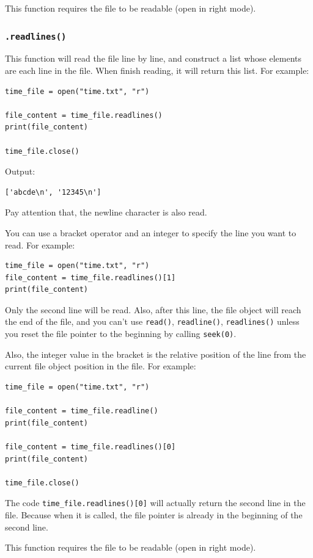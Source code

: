 \documentclass[12pt]{book}
\begin{document}
This function requires the file to be readable (open in right mode).
\subsubsection{\texttt{.readlines()}}
\label{sec:orgbf849f6}
This function will read the file line by line, and construct a list whose elements are each line in the file. When finish reading, it will return this list. For example:
\begin{verbatim}
time_file = open("time.txt", "r")

file_content = time_file.readlines()
print(file_content)

time_file.close()
\end{verbatim}
Output:
\begin{verbatim}
['abcde\n', '12345\n']
\end{verbatim}
Pay attention that, the newline character is also read.

You can use a bracket operator and an integer to specify the line you want to read. For example:
\begin{verbatim}
time_file = open("time.txt", "r")
file_content = time_file.readlines()[1]
print(file_content)
\end{verbatim}
Only the second line will be read. Also, after this line, the file object will reach the end of the file, and you can't use \texttt{read()}, \texttt{readline()}, \texttt{readlines()} unless you reset the file pointer to the beginning by calling \texttt{seek(0)}.

Also, the integer value in the bracket is the relative position of the line from the current file object position in the file. For example:
\begin{verbatim}
time_file = open("time.txt", "r")

file_content = time_file.readline()
print(file_content)

file_content = time_file.readlines()[0]
print(file_content)

time_file.close()
\end{verbatim}
The code \texttt{time\_file.readlines()[0]} will actually return the second line in the file. Because when it is called, the file pointer is already in the beginning of the second line.

This function requires the file to be readable (open in right mode).
\end{document}
